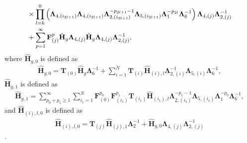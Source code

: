 \documentclass[twoside,11pt]{article}
\newcommand{\matF}{\mathbf{F}}
\newcommand{\hmatH}{{\hat{\mathbf{H}}}{}}
\newcommand{\matT}{\mathbf{T}}
\newcommand{\matLambda}{\mathbf{\Lambda}}
\begin{document}
{\begin{lemma}
\begin{align}
&\times \prod_{l=k}^0\left(\matLambda_{4,(i_{2l+1})}\matLambda_{4,(i_{2l+1})}\matLambda_{2,(i_{2l+1})}^{-p_{2l+1}-1}\matLambda_{5,(i_{2l+1})}\matLambda_{1}^{-p_{2l}}\matLambda_6^{-1}\right)\matLambda_{4,(j)}\matLambda_{2,(j)}^{-1}\notag\\
&+\sum_{p=1}^{\infty}\matF_{(j)}^p\hmatH_g\matLambda_{4,(j)}\hmatH_g\matLambda_{4,(j)}\matLambda_{2,(j)}^{-1},\notag\\
\label{eqn:ulcondition}
\end{align}
where $\hmatH_{g,0}$ is defined as
\begin{align}
    \hmatH_{g,0} = \matT_{(0)}\hmatH_g\matLambda_6^{-1} +\sum_{i=1}^N\matT_{(i)}\hmatH_{(i),l}\matLambda_{2,(i)}^{-1}\matLambda_{5,(i)}\matLambda_{6}^{-1},
\end{align}
$\hmatH_{g,1}$ is defined as
\begin{align}
    \hmatH_{g,1} = \sum_{p_0+p_1\ge 1}^{\infty}\sum_{i_1=1}^N\matF_{(0)}^{p_0}\matF_{(i_1)}^{p_1}\matT_{(i_1)}\hmatH_{(i_1),l}\matLambda_{2,(i_1)}^{-p_1-1}\matLambda_{5,(i_1)}\matLambda_{1}^{-p_0}\matLambda_6^{-1},
\end{align}
and $\hmatH_{(i),l,0}$ is defined as
\begin{align}
    \hmatH_{(i),l,0} = \matT_{(j)}\hmatH_{(j),1}\matLambda_2^{-1}+\hmatH_{g,0}\matLambda_{4,(j)}\matLambda_{2,(j)}^{-1}
\end{align}. 
\end{lemma}}
\end{document}
